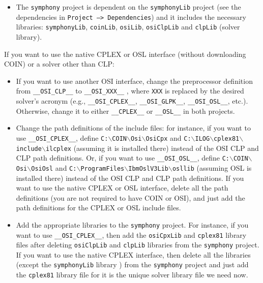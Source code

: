 \begin{itemize}
\begin{itemize}
\item The \texttt{symphony} project is dependent on the \texttt{symphonyLib} 
project (see the dependencies in \texttt{Project --> Dependencies}) 
and it includes the necessary libraries: \texttt{symphonyLib}, 
\texttt{coinLib}, \texttt{osiLib}, \texttt{osiClpLib} and \texttt{clpLib} 
(solver library).

\end{itemize}

If you want to use the native CPLEX or OSL interface 
(without downloading COIN) or a solver other than CLP:

\begin{itemize}

\item If you want to use another OSI interface, change the preprocessor
definition from \texttt{\_\_OSI\_CLP\_\_} to \texttt{\_\_OSI\_XXX\_\_} ,
where \texttt{XXX} is replaced by the desired solver's acronym (e.g.,
\texttt{\_\_OSI\_CPLEX\_\_}, \texttt{\_\_OSI\_GLPK\_\_},
\texttt{\_\_OSI\_OSL\_\_}, etc.). Otherwise, change it to either
\texttt{\_\_CPLEX\_\_} or \texttt{\_\_OSL\_\_} in both projects.

\item Change the path definitions of the include files: for instance, if you 
want to use \texttt{\_\_OSI\_CPLEX\_\_}, define
\texttt{C:$\backslash$COIN$\backslash$Osi$\backslash$OsiCpx} and 
\texttt{C:$\backslash$ILOG$\backslash$cplex81$\backslash$include$\backslash$ilcplex} 
(assuming it is installed there) instead of the OSI CLP and CLP path 
definitions. Or, if you want to use \texttt{\_\_OSI\_OSL\_\_}, define 
\texttt{C:$\backslash$COIN$\backslash$Osi$\backslash$OsiOsl} and 
\texttt{C:$\backslash$ProgramFiles$\backslash$IbmOslV3Lib$\backslash$osllib}
(assuming OSL is installed there) instead of the OSI CLP and CLP path 
definitions. If you want to use the native CPLEX or OSL interface, 
delete all the path  definitions (you are not required to have COIN or OSI), 
and just add the path definitions for the CPLEX or OSL include files.

\item Add the appropriate libraries to the \texttt{symphony} project. For
instance, if you want to use \texttt{\_\_OSI\_CPLEX\_\_}, then add the
\texttt{osiCpxLib} and \texttt{cplex81} library files after deleting 
\texttt{osiClpLib} and \texttt{clpLib} libraries from the
\texttt{symphony} project. If you want to use the native CPLEX interface, 
then delete all the libraries (except the \texttt{symphonyLib} library ) 
from the \texttt{symphony} project and just add the \texttt{cplex81} library 
file for it is the unique solver library file we need now.


\end{itemize}
\end{itemize}
